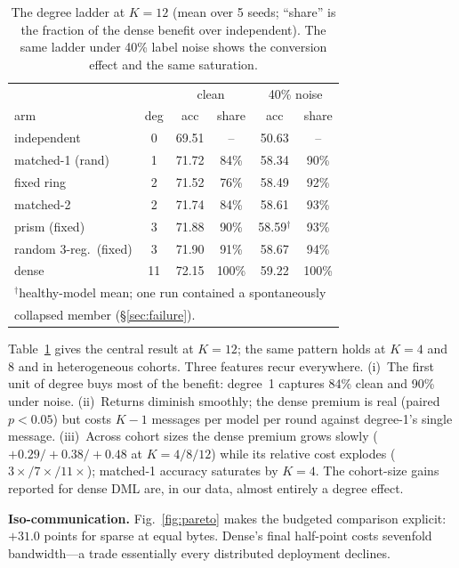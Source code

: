\documentclass[10pt,twocolumn]{article}
\begin{document}
\begin{table}[t]
\centering\small
\caption{The degree ladder at $K{=}12$ (mean over 5 seeds; ``share'' is the
fraction of the dense benefit over independent). The same ladder under 40\%
label noise shows the conversion effect and the same saturation.}
\label{tab:ladder}
\begin{tabular}{lccccc}
\toprule
 & & \multicolumn{2}{c}{clean} & \multicolumn{2}{c}{40\% noise}\\
arm & deg & acc & share & acc & share\\
\midrule
independent      & 0  & 69.51 & --    & 50.63 & -- \\
matched-1 (rand) & 1  & 71.72 & 84\%  & 58.34 & 90\% \\
fixed ring       & 2  & 71.52 & 76\%  & 58.49 & 92\% \\
matched-2        & 2  & 71.74 & 84\%  & 58.61 & 93\% \\
prism (fixed)    & 3  & 71.88 & 90\%  & 58.59$^{\dagger}$ & 93\% \\
random 3-reg.\ (fixed) & 3 & 71.90 & 91\% & 58.67 & 94\% \\
dense            & 11 & 72.15 & 100\% & 59.22 & 100\% \\
\bottomrule
\multicolumn{6}{l}{\scriptsize $^{\dagger}$healthy-model mean; one run
contained a spontaneously}\\[-2pt]
\multicolumn{6}{l}{\scriptsize collapsed member (\S\ref{sec:failure}).}
\end{tabular}
\end{table}

Table~\ref{tab:ladder} gives the central result at $K{=}12$; the same
pattern holds at $K=4$ and $8$ and in heterogeneous cohorts. Three features
recur everywhere. (i)~The first unit of degree buys most of the benefit:
degree~1 captures 84\% clean and 90\% under noise. (ii)~Returns diminish
smoothly; the dense premium is real (paired $p<0.05$) but costs $K{-}1$
messages per model per round against degree-1's single message. (iii)~Across
cohort sizes the dense premium grows slowly ($+0.29/+0.38/+0.48$ at
$K{=}4/8/12$) while its relative cost explodes ($3\times/7\times/11\times$);
matched-1 accuracy saturates by $K{=}4$. The cohort-size gains reported for
dense DML are, in our data, almost entirely a degree effect.

\textbf{Iso-communication.} Fig.~\ref{fig:pareto} makes the budgeted
comparison explicit: $+31.0$ points for sparse at equal bytes. Dense's final
half-point costs sevenfold bandwidth---a trade essentially every distributed
deployment declines.
\end{document}
